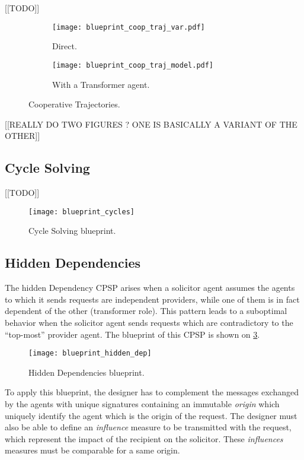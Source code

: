 [[TODO]]

\begin{figure}
\centering
	\begin{subfigure}{0.49\textwidth}
		\centering
		\texttt{[image: blueprint\_coop\_traj\_var.pdf]}
		\caption{Direct.}
	\end{subfigure}
	\begin{subfigure}{0.49\textwidth}
		\centering
		\texttt{[image: blueprint\_coop\_traj\_model.pdf]}
		\caption{With a Transformer agent.}
	\end{subfigure}
\caption{Cooperative Trajectories.}\label{blueprint_coop_traj}
\end{figure}

[[REALLY DO TWO FIGURES ? ONE IS BASICALLY A VARIANT OF THE OTHER]]

\subsection{Cycle Solving}

[[TODO]]

\begin{figure}
\centering
\texttt{[image: blueprint\_cycles]}
\caption{Cycle Solving blueprint.}\label{blueprint_cycles}
\end{figure}

\subsection{Hidden Dependencies}

The hidden Dependency CPSP arises when a solicitor agent assumes the agents to which it sends requests are independent providers, while one of them is in fact dependent of the other (transformer role). This pattern leads to a suboptimal behavior when the solicitor agent sends requests which are contradictory to the \enquote{top-most} provider agent. The blueprint of this CPSP is shown on \figurename{} \ref{blueprint_hidden_dep}.

\begin{figure}
\centering
\texttt{[image: blueprint\_hidden\_dep]}
\caption{Hidden Dependencies blueprint.}\label{blueprint_hidden_dep}
\end{figure}

To apply this blueprint, the designer has to complement the messages exchanged by the agents with unique signatures containing an immutable \emph{origin} which uniquely identify the agent which is the origin of the request. The designer must also be able to define an \emph{influence} measure to be transmitted with the request, which represent the impact of the recipient on the solicitor. These \emph{influences} measures must be comparable for a same origin.

